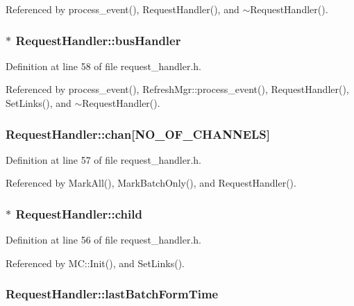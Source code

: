 Referenced by process\_\-event(), RequestHandler(), and $\sim$RequestHandler().
\subsubsection[{busHandler}]{$\ast$ {\bf RequestHandler::busHandler}}\label{classRequestHandler_8ede46daf657b02d2eb5fc85fc499c0a}




Definition at line 58 of file request\_\-handler.h.

Referenced by process\_\-event(), RefreshMgr::process\_\-event(), RequestHandler(), SetLinks(), and $\sim$RequestHandler().
\subsubsection[{chan}]{ {\bf RequestHandler::chan}[{\bf NO\_\-OF\_\-CHANNELS}]}\label{classRequestHandler_ce2dff9fc4bc90740663ab1b5c6d1a02}




Definition at line 57 of file request\_\-handler.h.

Referenced by MarkAll(), MarkBatchOnly(), and RequestHandler().
\subsubsection[{child}]{$\ast$ {\bf RequestHandler::child}}\label{classRequestHandler_f1ac97204e61fc5e487a0321fb0fcd7a}




Definition at line 56 of file request\_\-handler.h.

Referenced by MC::Init(), and SetLinks().
\subsubsection[{lastBatchFormTime}]{ {\bf RequestHandler::lastBatchFormTime}}\label{classRequestHandler_71b4ced7b007998a6f65f5ee1e09925a}




